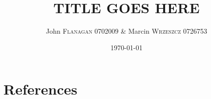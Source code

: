 \documentclass[pdftex,11pt,a4paper]{article}
\author{John \textsc{Flanagan} 0702009 \& Marcin \textsc{Wrzeszcz} 0726753 }
\title{TITLE GOES HERE}
\date{\today}
\begin{document}

\pagebreak





\tableofcontents

\pagebreak

\pagebreak


\pagebreak


\pagebreak


\pagebreak


\pagebreak

\pagebreak
\section{References}
\def\refname{}


\end{document}
